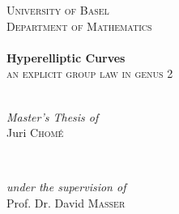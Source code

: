 \begin{titlepage}


\center %
 



\textsc{\Huge University of Basel}\\[0.2cm] %
\textsc{\Large Department of Mathematics}\\[3cm] %


\HRule \\[0.6cm]
{ \huge \bfseries Hyperelliptic Curves}\\[0.3cm] %
\textsc{\Large an explicit group law in genus 2}\\[0.2cm]
\HRule \\[2.5cm]





\begin{minipage}{0.4\textwidth}
\begin{flushleft} \large
\emph{Master's Thesis of}\\
Juri \textsc{Chomé} %
\end{flushleft}
\end{minipage}
~
\begin{minipage}{0.4\textwidth}
\begin{flushright} \large
\emph{under the supervision of} \\
Prof. Dr. David \textsc{Masser} %
\end{flushright}
\end{minipage}\\[6cm]


\end{titlepage}
